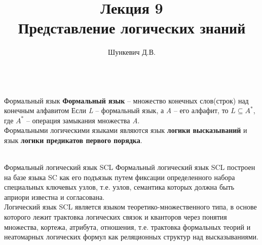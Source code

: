 \title{Лекция 9\\Представление логических знаний}
\author[]{Шункевич Д.В.}

\begin{frame}
	\titlepage
\end{frame}

\begin{frame}{\\Формальный язык}
	\topline
	\justifying	
	\textbf{Формальный язык} -- множество конечных слов(строк) над конечным алфавитом
	Если \textit{L} -- формальный язык, а \textit{A} -- его алфафит, то $L \subseteq A^*$, где $A^*$ -- операция замыкания множества \textit{A}.\\
	Формальными логическими языками являются язык \textbf{логики высказываний} и язык \textbf{логики предикатов первого порядка}.	
\end{frame}

\begin{frame}{\\Формальный логический язык SCL}
	\topline
	\justifying
	Формальный логический язык SCL построен на базе языка SC как его подъязык путем фиксации определенного набора специальных ключевых узлов, т.е. узлов, семантика которых должна быть априори
	известна и согласована.\\
	Логический язык SCL является языком теоретико-множественного типа, в основе которого лежит трактовка логических связок и кванторов через понятия множества, кортежа, атрибута, отношения, т.е.
	трактовка формальных теорий и неатомарных логических формул как реляционных структур над высказываниями. 
\end{frame}

